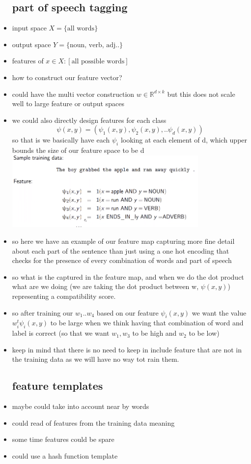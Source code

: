 \documentclass{article}
\begin{document}
\begin{itemize}
\subsection*{part of speech tagging}
\item input space $X=\{\text{all words}\}$
\item output space $Y=\{\text{noun, verb, adj..}\}$
\item features of $x\in X:[\text{all possible words}]$
\item how to construct our feature vector?
\item could have the multi vector construction $w\in \mathbb{R}^{d\times k}$ but this does not scale well to large feature or output spaces
\item we could also directly design features for each class $$\psi(x,y)=(\psi_{1}(x,y),\psi_{2}(x,y),..\psi_{d}(x,y))$$ 
so that is we basically have each $\psi_{i}$ looking at each element of d, which upper bounds the size of our feature space to be d \\
\includegraphics[width=10cm]{lecture_notes/lecture_8/immages/l8_9.png}
\item so here we have an example of our feature map capturing more fine detail about each part of the sentence than just using a one hot encoding that checks for the presence of every combination of words and part of speech
\item so what is the captured in the feature map, and when we do the dot product what are we doing (we are taking the dot product between w, $\psi(x,y)$) representing a compatibility score. 
\item so after training our $w_1..w_4$ based on our feature $\psi_{i}(x,y)$ we want the value $w_i^{t}\psi_i(x,y)$ to be large when we think having that combination of word and label is correct (so that we want  $w_1, w_3$ to be high and $w_2$ to be low)
\item keep in mind that there is no need to keep in include feature that are not in the training data as we will have no way tot rain them.
\subsection*{feature templates}
\item   maybe could take into account near by words 
\item could read of features from the training data meaning 
\item some time features could be spare 
\item could use a hash function template

\end{itemize}
\end{document}
